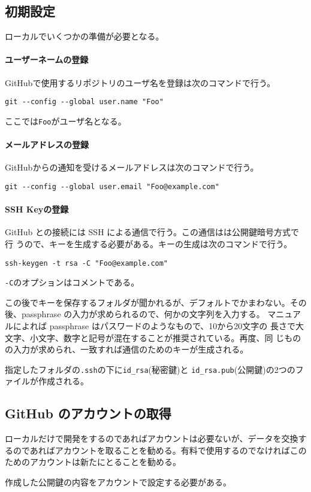 \subsection{初期設定}
ローカルでいくつかの準備が必要となる。

\paragraph{ユーザーネームの登録}
GitHubで使用するリポジトリのユーザ名を登録は次のコマンドで行う。

\Verb+git --config --global user.name "Foo"+

ここでは\Verb+Foo+がユーザ名となる。
\paragraph{メールアドレスの登録}
GitHubからの通知を受けるメールアドレスは次のコマンドで行う。

\Verb+git --config --global user.email "Foo@example.com"+
\paragraph{SSH Keyの登録}
GitHub との接続には SSH による通信で行う。この通信はは公開鍵暗号方式で行
うので、キーを生成する必要がある。キーの生成は次のコマンドで行う。

\Verb+ssh-keygen -t rsa -C "Foo@example.com"+

\Verb+-C+のオプションはコメントである。 

この後でキーを保存するフォルダが聞かれるが、デフォルトでかまわない。その
後、passphrase の入力が求められるので、何かの文字列を入力する。
マニュアルによれば passphrase はパスワードのようなもので、10から20文字の
長さで大文字、小文字、数字と記号が混在することが推奨されている。再度、同
じものの入力が求められ、一致すれば通信のためのキーが生成される。

指定したフォルダの\Verb+.ssh+の下に\Verb+id_rsa+(秘密鍵)と
\Verb+id_rsa.pub+(公開鍵)の2つのファイルが作成される。 

\subsection{GitHub のアカウントの取得}
ローカルだけで開発をするのであればアカウントは必要ないが、データを交換す
るのであればアカウントを取ることを勧める。有料で使用するのでなければこの
ためのアカウントは新たにとることを勧める。

作成した公開鍵の内容をアカウントで設定する必要がある。

